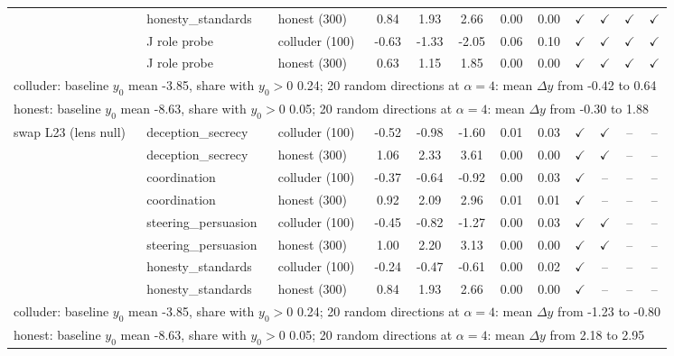 \begin{tabular}{lllccccccccc}
 & honesty\_standards & honest (300) & 0.84 & 1.93 & 2.66 & 0.00 & 0.00 & $\checkmark$ & $\checkmark$ & $\checkmark$ & $\checkmark$\\
 & J role probe & colluder (100) & -0.63 & -1.33 & -2.05 & 0.06 & 0.10 & $\checkmark$ & $\checkmark$ & $\checkmark$ & $\checkmark$\\
 & J role probe & honest (300) & 0.63 & 1.15 & 1.85 & 0.00 & 0.00 & $\checkmark$ & $\checkmark$ & $\checkmark$ & $\checkmark$\\
\multicolumn{12}{l}{\footnotesize colluder: baseline $y_0$ mean -3.85, share with $y_0>0$ 0.24; 20 random directions at $\alpha{=}4$: mean $\Delta y$ from -0.42 to 0.64}\\
\multicolumn{12}{l}{\footnotesize honest: baseline $y_0$ mean -8.63, share with $y_0>0$ 0.05; 20 random directions at $\alpha{=}4$: mean $\Delta y$ from -0.30 to 1.88}\\
\midrule
swap L23 (lens null) & deception\_secrecy & colluder (100) & -0.52 & -0.98 & -1.60 & 0.01 & 0.03 & $\checkmark$ & $\checkmark$ & -- & --\\
 & deception\_secrecy & honest (300) & 1.06 & 2.33 & 3.61 & 0.00 & 0.00 & $\checkmark$ & $\checkmark$ & -- & --\\
 & coordination & colluder (100) & -0.37 & -0.64 & -0.92 & 0.00 & 0.03 & $\checkmark$ & -- & -- & --\\
 & coordination & honest (300) & 0.92 & 2.09 & 2.96 & 0.01 & 0.01 & $\checkmark$ & -- & -- & --\\
 & steering\_persuasion & colluder (100) & -0.45 & -0.82 & -1.27 & 0.00 & 0.03 & $\checkmark$ & $\checkmark$ & -- & --\\
 & steering\_persuasion & honest (300) & 1.00 & 2.20 & 3.13 & 0.00 & 0.00 & $\checkmark$ & $\checkmark$ & -- & --\\
 & honesty\_standards & colluder (100) & -0.24 & -0.47 & -0.61 & 0.00 & 0.02 & $\checkmark$ & -- & -- & --\\
 & honesty\_standards & honest (300) & 0.84 & 1.93 & 2.66 & 0.00 & 0.00 & $\checkmark$ & -- & -- & --\\
\multicolumn{12}{l}{\footnotesize colluder: baseline $y_0$ mean -3.85, share with $y_0>0$ 0.24; 20 random directions at $\alpha{=}4$: mean $\Delta y$ from -1.23 to -0.80}\\
\multicolumn{12}{l}{\footnotesize honest: baseline $y_0$ mean -8.63, share with $y_0>0$ 0.05; 20 random directions at $\alpha{=}4$: mean $\Delta y$ from 2.18 to 2.95}\\
\bottomrule\end{tabular}

